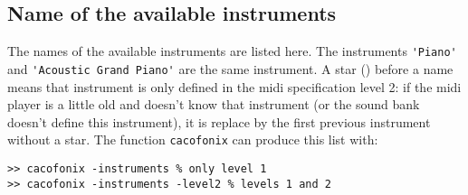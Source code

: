 \documentclass{article}
\newcommand\lvlt{\ding{105}}
\begin{document}
\subsection{Name of the available instruments}
\label{sec:AvailInstruments}

The names of the available instruments are listed here. The instruments \lstinline!'Piano'! and \lstinline!'Acoustic Grand Piano'! are the same instrument. A star (\lvlt) before a name means that instrument is only defined in the midi specification level 2: if the midi player is a little old and doesn't know that instrument (or the sound bank doesn't define this instrument), it is replace by the first previous instrument without a star. The function \lstinline!cacofonix! can produce this list with:
\begin{lstlisting}
>> cacofonix -instruments % only level 1
>> cacofonix -instruments -level2 % levels 1 and 2
\end{lstlisting}
\end{document}

